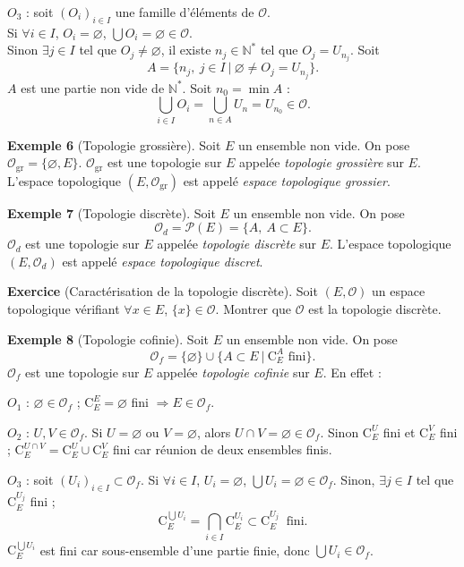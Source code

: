 \documentclass[11pt,a4paper]{article}
\newcommand{\N}{\mathbb{N}}
\newcommand{\Pp}{\mathscr{P}}
\newcommand{\Oo}{\mathscr{O}}
\newcommand{\cE}[1]{\mathrm{C}_E^{#1}}
\begin{document}
$O_3$ : soit $(O_i)_{i\in I}$ une famille d'éléments de $\Oo$.\\
Si $\forall i\in I$, $O_i=\varnothing$, $\bigcup O_i=\varnothing\in\Oo$.\\
Sinon $\exists j\in I$ tel que $O_j\neq\varnothing$, il existe $n_j\in\N^*$ tel que $O_j=U_{n_j}$. Soit
\[
  A=\bigl\{n_j,\ j\in I\ \big|\ \varnothing\neq O_j=U_{n_j}\bigr\}.
\]
$A$ est une partie non vide de $\N^*$. Soit $n_0=\min A$ :
\[
  \bigcup_{i\in I}O_i=\bigcup_{n\in A}U_n=U_{n_0}\in\Oo .
\]

\textbf{\color{bleu}Exemple 6} (Topologie grossière). Soit $E$ un ensemble non vide. On pose $\Oo_{\mathrm{gr}}=\{\varnothing,E\}$.
$\Oo_{\mathrm{gr}}$ est une topologie sur $E$ appelée \emph{topologie grossière} sur $E$.
L'espace topologique $(E,\Oo_{\mathrm{gr}})$ est appelé \emph{espace topologique grossier}.

\textbf{\color{bleu}Exemple 7} (Topologie discrète). Soit $E$ un ensemble non vide. On pose
\[
  \Oo_d=\Pp(E)=\{A,\ A\subset E\}.
\]
$\Oo_d$ est une topologie sur $E$ appelée \emph{topologie discrète} sur $E$.
L'espace topologique $(E,\Oo_d)$ est appelé \emph{espace topologique discret}.

\textbf{\color{bleu}Exercice} (Caractérisation de la topologie discrète). Soit $(E,\Oo)$ un espace topologique vérifiant $\forall x\in E$, $\{x\}\in\Oo$.
Montrer que $\Oo$ est la topologie discrète.

\textbf{\color{bleu}Exemple 8} (Topologie cofinie). Soit $E$ un ensemble non vide. On pose
\[
  \Oo_f=\{\varnothing\}\cup\bigl\{A\subset E\ \big|\ \cE{A}\text{ fini}\bigr\}.
\]
$\Oo_f$ est une topologie sur $E$ appelée \emph{topologie cofinie} sur $E$. En effet :

$O_1$ : $\varnothing\in\Oo_f$ ; $\cE{E}=\varnothing$ fini $\Rightarrow E\in\Oo_f$.

$O_2$ : $U,V\in\Oo_f$. Si $U=\varnothing$ ou $V=\varnothing$, alors $U\cap V=\varnothing\in\Oo_f$.
Sinon $\cE{U}$ fini et $\cE{V}$ fini ; $\cE{U\cap V}=\cE{U}\cup\cE{V}$ fini car réunion de deux ensembles finis.

$O_3$ : soit $(U_i)_{i\in I}\subset\Oo_f$. Si $\forall i\in I$, $U_i=\varnothing$, $\bigcup U_i=\varnothing\in\Oo_f$.
Sinon, $\exists j\in I$ tel que $\cE{U_j}$ fini ;
\[
  \cE{\bigcup U_i}=\bigcap_{i\in I}\cE{U_i}\subset\cE{U_j}\ \text{ fini.}
\]
$\cE{\bigcup U_i}$ est fini car sous-ensemble d'une partie finie, donc $\bigcup U_i\in\Oo_f$.

\end{document}
